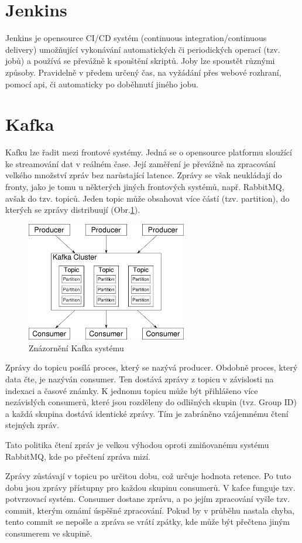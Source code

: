 \documentclass[thesis=M,czech,hidelinks]{FITthesis}[2013/05/06]
\begin{document}
\section{Jenkins} \label{sec:jenkins}
Jenkins je opensource CI/CD systém (continuous integration/continuous delivery) umožňující vykonávání automatických či periodických operací (tzv. jobů) a používá se převážně k spouštění skriptů. Joby lze spoustět různými způsoby. Pravidelně v předem určený čas, na vyžádání přes webové rozhraní, pomocí api, či automaticky po doběhnutí jiného jobu.

\section{Kafka}\label{sec:kafka}
Kafku lze řadit mezi frontové systémy. Jedná se o opensource platformu sloužící ke streamování dat v reálném čase. Její zaměření je převážně na zpracování velkého množství zpráv bez narůstající latence. Zprávy se však neukládají do fronty, jako je tomu u některých jiných frontových systémů, např. RabbitMQ, avšak do tzv. topiců. Jeden topic může obsahovat více částí (tzv. partition), do kterých se zprávy distribuují (Obr.\ref{fig:kafka}). 
\begin{figure}[h]
	\centering
	\includegraphics[width=7cm]{pictures/kafka.png}
	\caption{Znázornění Kafka systému \cite{kafka}}
	\label{fig:kafka}
\end{figure}
Zprávy do topicu posílá proces, který se nazývá producer. Obdobně proces, který data čte, je nazýván consumer. Ten dostává zprávy z topicu v závislosti na indexaci a časové známky. K jednomu topicu může být přihlášeno více nezávislých consumerů, které jsou rozděleny do odlišných skupin (tvz. Group ID) a každá skupina dostává identické zprávy. Tím je zabráněno vzájemnému čtení stejných zpráv.

Tato politika čtení zpráv je velkou výhodou oproti zmiňovanému systému RabbitMQ, kde po přečtení zpráva mizí. 

Zprávy zůstávají v topicu po určitou dobu, což určuje hodnota retence. Po tuto dobu jsou zprávy přístupny pro každou skupinu consumerů. V kafce funguje tzv. potvrzovací systém. Consumer dostane zprávu, a po jejím zpracování vyšle tzv. commit, kterým oznámí úspěšné zpracování. Pokud by v průběhu nastala chyba, tento commit se nepošle a zpráva se vrátí zpátky, kde může být přečtena jiným consumerem ve skupině.
\end{document}
